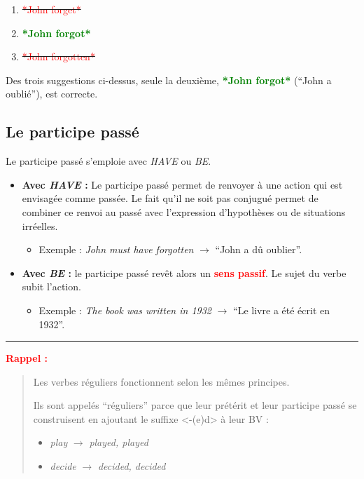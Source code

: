 \documentclass[
]{article}
\providecommand{\tightlist}{%
  \setlength{\itemsep}{0pt}\setlength{\parskip}{0pt}}
\begin{document}
\begin{enumerate}
\def\labelenumi{\arabic{enumi}.}
\tightlist
\item
  \sout{\textcolor{red}{*John forget*}}
\item
  \textbf{\textcolor{green}{*John forgot*}}
\item
  \sout{\textcolor{red}{*John forgotten*}}
\end{enumerate}

Des trois suggestions ci-dessus, seule la deuxième, \textbf{\textcolor{green}{*John forgot*}} (``John a oublié''), est correcte.

\hypertarget{le-participe-passuxe9}{%
\subsection{Le participe passé}\label{le-participe-passuxe9}}

Le participe passé s'emploie avec \emph{HAVE} ou \emph{BE}.

\begin{itemize}
\tightlist
\item
  \textbf{Avec \emph{HAVE} :} Le participe passé permet de renvoyer à une action qui est envisagée comme passée.
  Le fait qu'il ne soit pas conjugué permet de combiner ce renvoi au passé avec l'expression d'hypothèses ou de situations irréelles.

  \begin{itemize}
  \tightlist
  \item
    Exemple : \emph{John must have forgotten} \(\rightarrow\) ``John a dû oublier''.
  \end{itemize}
\item
  \textbf{Avec \emph{BE} :} le participe passé revêt alors un \textbf{\textcolor{red}{sens passif}}. Le sujet du verbe subit l'action.

  \begin{itemize}
  \tightlist
  \item
    Exemple : \emph{The book was written in 1932} \(\rightarrow\) ``Le livre a été écrit en 1932''.
  \end{itemize}
\end{itemize}

\begin{center}\rule{0.5\linewidth}{0.5pt}\end{center}

\textbf{\textcolor{red}{Rappel :}}

\begin{quote}
Les verbes réguliers fonctionnent selon les mêmes principes.

Ils sont appelés ``réguliers'' parce que leur prétérit et leur participe passé se construisent en ajoutant le suffixe \textless-(e)d\textgreater{} à leur BV :

\begin{itemize}
\item
  \emph{play} \(\rightarrow\) \emph{played, played}
\item
  \emph{decide} \(\rightarrow\) \emph{decided, decided}
\end{itemize}
\end{quote}
\end{document}
